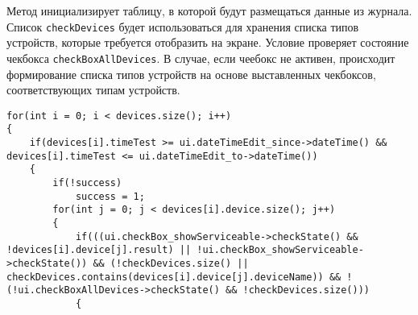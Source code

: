 Метод инициализирует таблицу, в которой будут размещаться данные из журнала. Список \texttt{checkDevices} будет
использоваться для хранения списка типов устройств, которые требуется отобразить на экране. Условие проверяет состояние
чекбокса \texttt{checkBoxAllDevices}. В случае, если чеебокс не активен, происходит формирование списка типов устройств
на основе выставленных чекбоксов, соответствующих типам устройств.
\medskip
\begin{verbatim}
for(int i = 0; i < devices.size(); i++)
{
	if(devices[i].timeTest >= ui.dateTimeEdit_since->dateTime() && devices[i].timeTest <= ui.dateTimeEdit_to->dateTime())
	{
		if(!success)
			success = 1;
		for(int j = 0; j < devices[i].device.size(); j++)
		{
			if(((ui.checkBox_showServiceable->checkState() && !devices[i].device[j].result) || !ui.checkBox_showServiceable->checkState()) && (!checkDevices.size() || checkDevices.contains(devices[i].device[j].deviceName)) && !(!ui.checkBoxAllDevices->checkState() && !checkDevices.size()))
			{
\end{verbatim}
\medskip

